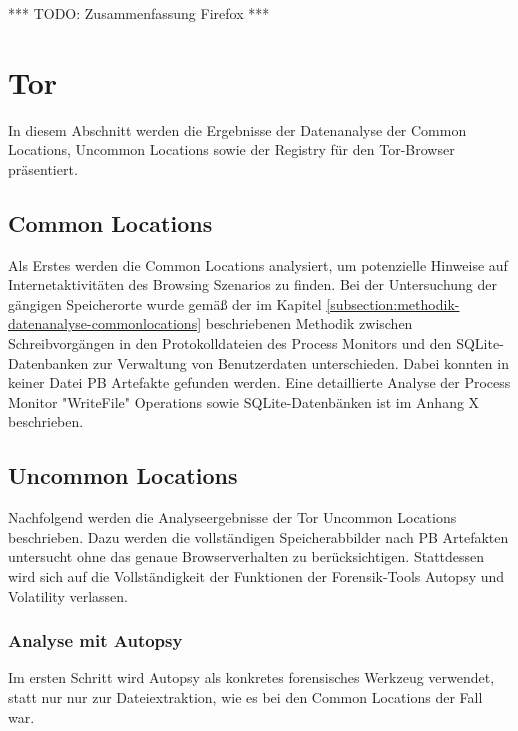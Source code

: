 *** TODO: Zusammenfassung Firefox ***


\newpage




\section{Tor}

In diesem Abschnitt werden die Ergebnisse der Datenanalyse der Common Locations, Uncommon Locations sowie der Registry für den Tor-Browser präsentiert.

\subsection*{Common Locations}
Als Erstes werden die Common Locations analysiert, um potenzielle Hinweise auf Internetaktivitäten des Browsing Szenarios zu finden. Bei der Untersuchung der gängigen Speicherorte wurde gemäß der im Kapitel \ref{subsection:methodik-datenanalyse-commonlocations} beschriebenen Methodik zwischen Schreibvorgängen in den Protokolldateien des Process Monitors und den SQLite-Datenbanken zur Verwaltung von Benutzerdaten unterschieden. Dabei konnten in keiner Datei PB Artefakte gefunden werden. Eine detaillierte Analyse der Process Monitor "WriteFile" Operations sowie SQLite-Datenbänken ist im Anhang X beschrieben.

\subsection*{Uncommon Locations}
Nachfolgend werden die Analyseergebnisse der Tor Uncommon Locations beschrieben.
Dazu werden die vollständigen Speicherabbilder nach PB Artefakten untersucht ohne das genaue Browserverhalten zu berücksichtigen. Stattdessen wird sich auf die Vollständigkeit der Funktionen der Forensik-Tools Autopsy und Volatility verlassen.

\subsubsection*{Analyse mit Autopsy}

Im ersten Schritt wird Autopsy als konkretes forensisches Werkzeug verwendet, statt nur nur zur Dateiextraktion, wie es bei den Common Locations der Fall war.

